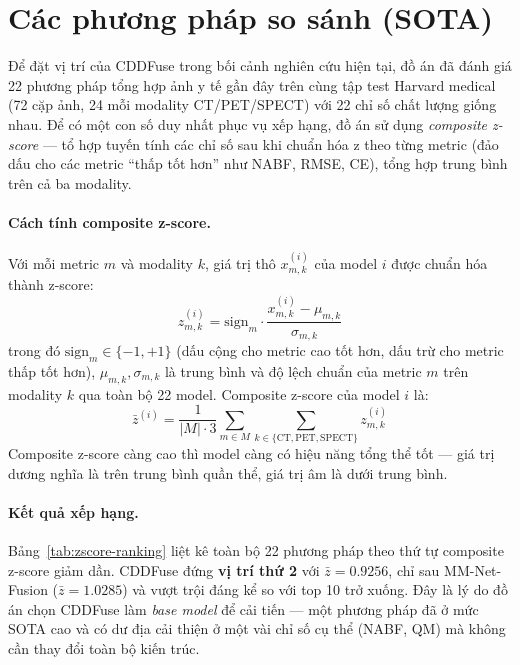 \section{Các phương pháp so sánh (SOTA)}
\label{sec:sota}

Để đặt vị trí của CDDFuse trong bối cảnh nghiên cứu hiện tại, đồ án đã đánh giá 22 phương pháp tổng hợp ảnh y tế gần đây trên cùng tập test Harvard medical (72 cặp ảnh, 24 mỗi modality CT/PET/SPECT) với 22 chỉ số chất lượng giống nhau. Để có một con số duy nhất phục vụ xếp hạng, đồ án sử dụng \emph{composite z-score} --- tổ hợp tuyến tính các chỉ số sau khi chuẩn hóa z theo từng metric (đảo dấu cho các metric ``thấp tốt hơn'' như NABF, RMSE, CE), tổng hợp trung bình trên cả ba modality.

\paragraph{Cách tính composite z-score.}
Với mỗi metric $m$ và modality $k$, giá trị thô $x_{m,k}^{(i)}$ của model $i$ được chuẩn hóa thành z-score:
\begin{equation}
z_{m,k}^{(i)} = \mathrm{sign}_m \cdot \frac{x_{m,k}^{(i)} - \mu_{m,k}}{\sigma_{m,k}}
\end{equation}
trong đó $\mathrm{sign}_m \in \{-1, +1\}$ (dấu cộng cho metric cao tốt hơn, dấu trừ cho metric thấp tốt hơn), $\mu_{m,k}, \sigma_{m,k}$ là trung bình và độ lệch chuẩn của metric $m$ trên modality $k$ qua toàn bộ 22 model. Composite z-score của model $i$ là:
\begin{equation}
\bar{z}^{(i)} = \frac{1}{|M| \cdot 3} \sum_{m \in M} \sum_{k \in \{\mathrm{CT}, \mathrm{PET}, \mathrm{SPECT}\}} z_{m,k}^{(i)}
\end{equation}
Composite z-score càng cao thì model càng có hiệu năng tổng thể tốt --- giá trị dương nghĩa là trên trung bình quần thể, giá trị âm là dưới trung bình.

\paragraph{Kết quả xếp hạng.}
Bảng~\ref{tab:zscore-ranking} liệt kê toàn bộ 22 phương pháp theo thứ tự composite z-score giảm dần. CDDFuse đứng \textbf{vị trí thứ 2} với $\bar{z} = 0.9256$, chỉ sau MM-Net-Fusion ($\bar{z} = 1.0285$) và vượt trội đáng kể so với top 10 trở xuống. Đây là lý do đồ án chọn CDDFuse làm \emph{base model} để cải tiến --- một phương pháp đã ở mức SOTA cao và có dư địa cải thiện ở một vài chỉ số cụ thể (NABF, QM) mà không cần thay đổi toàn bộ kiến trúc.

